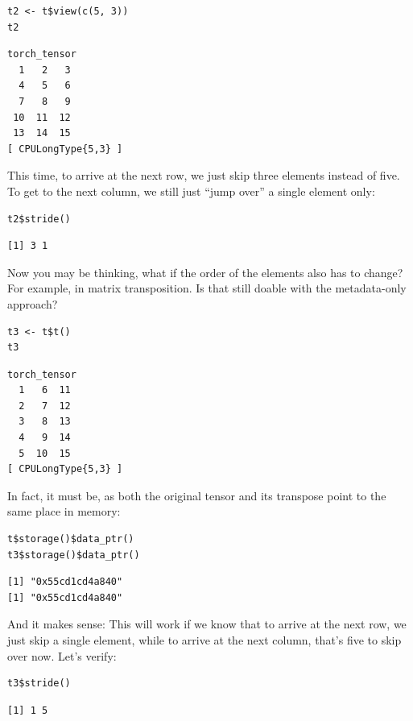 \documentclass[
  letterpaper,
]{krantz}
\begin{document}
\begin{verbatim}
t2 <- t$view(c(5, 3))
t2
\end{verbatim}

\begin{verbatim}
torch_tensor
  1   2   3
  4   5   6
  7   8   9
 10  11  12
 13  14  15
[ CPULongType{5,3} ]
\end{verbatim}

This time, to arrive at the next row, we just skip three elements
instead of five. To get to the next column, we still just ``jump over''
a single element only:

\begin{verbatim}
t2$stride()
\end{verbatim}

\begin{verbatim}
[1] 3 1
\end{verbatim}

Now you may be thinking, what if the order of the elements also has to
change? For example, in matrix transposition. Is that still doable with
the metadata-only approach?

\begin{verbatim}
t3 <- t$t()
t3
\end{verbatim}

\begin{verbatim}
torch_tensor
  1   6  11
  2   7  12
  3   8  13
  4   9  14
  5  10  15
[ CPULongType{5,3} ]
\end{verbatim}

In fact, it must be, as both the original tensor and its transpose point
to the same place in memory:

\begin{verbatim}
t$storage()$data_ptr()
t3$storage()$data_ptr()
\end{verbatim}

\begin{verbatim}
[1] "0x55cd1cd4a840"
[1] "0x55cd1cd4a840"
\end{verbatim}

And it makes sense: This will work if we know that to arrive at the next
row, we just skip a single element, while to arrive at the next column,
that's five to skip over now. Let's verify:

\begin{verbatim}
t3$stride()
\end{verbatim}

\begin{verbatim}
[1] 1 5
\end{verbatim}
\end{document}
